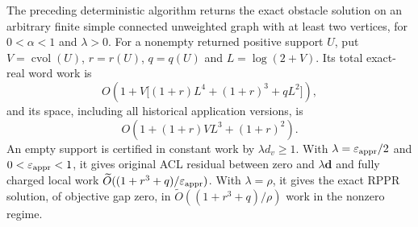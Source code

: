 \begin{theorem}
\label{thm:op3-local-cycle-rank}
The preceding deterministic algorithm returns the exact obstacle solution
on an arbitrary finite simple connected unweighted graph with at least two
vertices, for $0<\alpha<1$ and $\lambda>0$.
For a nonempty returned positive support $U$, put
$V=\operatorname{cvol}(U)$, $r=r(U)$, $q=q(U)$ and $L=\log(2+V)$.
Its total exact-real word work is
\begin{equation}
 O\!\left(1+V\bigl[(1+r)L^4+(1+r)^3+qL^2\bigr]\right),
 \label{eq:op3-cycle-rank-work}
\end{equation}
and its space, including all historical application versions, is
\begin{equation}
 O\!\left(1+(1+r)VL^3+(1+r)^2\right).
 \label{eq:op3-cycle-rank-space}
\end{equation}
An empty support is certified in constant work by $\lambda d_v\geq1$.
With $\lambda=\varepsilon_{\mathrm{appr}}/2$ and $0<\varepsilon_{\mathrm{appr}}<1$, it gives original ACL residual between zero and
$\lambda\boldsymbol d$ and fully charged local work
$\widetilde O((1+r^3+q)/\varepsilon_{\mathrm{appr}})$.
With $\lambda=\rho$, it gives the exact RPPR solution, of objective gap zero,
in $\widetilde O((1+r^3+q)/\rho)$ work in the nonzero regime.
\end{theorem}
